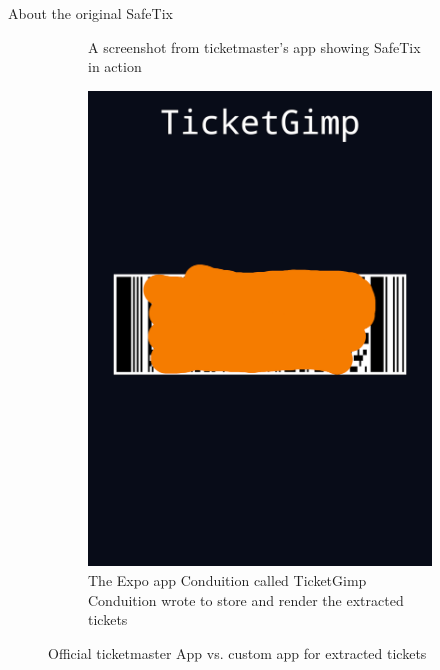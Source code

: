 \documentclass[final,dvipsnames]{beamer}
\newlength{\colwidth}
\begin{document}
\begin{frame}[t, fragile]
\begin{columns}[t]
\begin{column}{\colwidth}
\begin{block}{About the original SafeTix}
\begin{figure}[h]
\begin{subfigure}{.5\textwidth}
                \caption{A screenshot from ticketmaster's app showing SafeTix in action \cite{ticketmaster_mobile_ticketing}}
                \label{fig:app_barcode}
            \end{subfigure}%
            \begin{subfigure}{.5\textwidth}
                \centering
                \includegraphics[width=1\linewidth]{figures/Conduition_custom_ticket_app.png}
                \caption{The Expo app Conduition called TicketGimp Conduition wrote to store and render the extracted tickets \cite{reverse_engineering_ticketmaster}}
                \label{fig:conduition_custom_app}
            \end{subfigure}
            \caption{Official ticketmaster App vs. custom app for extracted tickets}
        \end{figure}
    \end{block}


\end{column}
\end{columns}
\end{frame}
\end{document}

